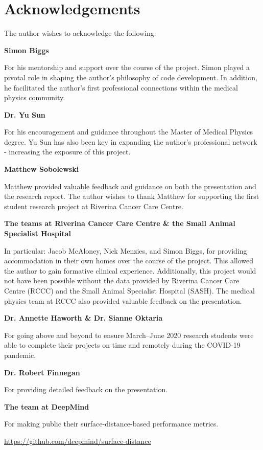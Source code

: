 \chapter{Acknowledgements}
\label{ch:acknowledgements}

The author wishes to acknowledge the following:

\textbf{Simon Biggs}

For his mentorship and support over the course of the project. Simon played a pivotal role
in shaping the author's philosophy of code development. In addition, he facilitated the
author's first professional connections within the medical physics community.

\textbf{Dr. Yu Sun}

For his encouragement and guidance throughout the Master of Medical Physics degree. Yu Sun has also been key in expanding the author's professional network - increasing the exposure of this project.

\textbf{Matthew Sobolewski}

Matthew provided valuable feedback and guidance on both the presentation and the research report. The author wishes to thank Matthew for supporting the first student research project at Riverina Cancer Care Centre.

\textbf{The teams at Riverina Cancer Care Centre \& the Small Animal Specialist Hospital}

In particular: Jacob McAloney, Nick Menzies, and
Simon Biggs, for providing accommodation in their own homes over the course of
the project. This allowed the author to gain formative clinical experience. Additionally, this project would not have been possible without the data provided by Riverina Cancer Care Centre (RCCC) and the Small Animal Specialist Hospital (SASH). The medical physics team at RCCC also provided valuable feedback on the presentation.


\textbf{Dr. Annette Haworth \& Dr. Sianne Oktaria}

For going above and beyond to ensure March--June 2020 research students were able to complete their projects on time and remotely during the COVID-19 pandemic.

\textbf{Dr. Robert Finnegan}

For providing detailed feedback on the presentation.

\textbf{The team at DeepMind}

For making public their surface-distance-based performance metrics.

\url{https://github.com/deepmind/surface-distance}
